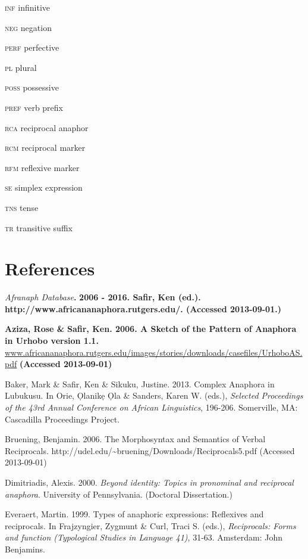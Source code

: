 \textsc{inf}    infinitive

\textsc{neg}    negation

\textsc{perf    }perfective

\textsc{pl}    plural

\textsc{poss}    possessive

\textsc{pref    }verb prefix

\textsc{rca    }reciprocal anaphor

\textsc{rcm}    reciprocal marker

\textsc{rfm}    reflexive marker

\textsc{se}    simplex expression  

\textsc{tns}    tense

\textsc{tr    }transitive suffix

\chapter{References}

\emph{\textup{Afranaph Database}}\textbf{\textmd{. }}\textbf{2006 - 2016. Safir, Ken (ed.). http://www.africananaphora.rutgers.edu/. (Accessed 2013-09-01.)}

\textbf{\textmd{Aziza, Rose \& }}\textbf{ Safir, Ken. 2006. A Sketch of the Pattern of Anaphora in Urhobo version 1.1. }\href{http://www.africananaphora.rutgers.edu/images/stories/downloads/casefiles/UrhoboAS.pdf}{{www.africananaphora.rutgers.edu/images/stories/downloads/casefiles/UrhoboAS.pdf}}\textbf{ (Accessed 2013-09-01)}

Baker, Mark \& Safir, Ken \& Sikuku, Justine. 2013. Complex Anaphora in Lubukusu. In Orie, Ọlanikẹ Ọla \& Sanders, Karen W. (eds.), \textit{Selected Proceedings of the 43rd Annual Conference on African Linguistics}, 196-206. Somerville, MA: Cascadilla Proceedings Project.

Bruening, Benjamin. 2006. The Morphosyntax and Semantics of Verbal Reciprocals. http://udel.edu/{\textasciitilde}bruening/Downloads/Reciprocals5.pdf (Accessed 2013-09-01)

\begin{styleWWDefault}
Dimitriadis, Alexis. 2000. \textit{Beyond identity: Topics in pronominal and reciprocal anaphora}. University of Pennsylvania. (Doctoral Dissertation.)
\end{styleWWDefault}

Everaert, Martin. 1999. Types of anaphoric expressions: Reflexives and reciprocals. In Frajzyngier, Zygmunt \& Curl, Traci S. (eds.), \textit{Reciprocals: Forms and function (Typological Studies in Language 41)},\textit{ }31-63. Amsterdam: John Benjamins.

